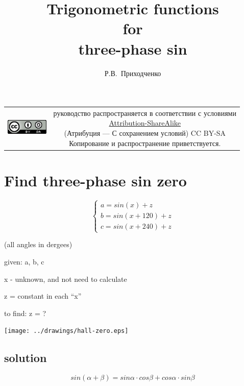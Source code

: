 \documentclass[unicode, 12pt, a4paper]{article}
\author{Р.В.~Приходченко}
\title{Trigonometric functions\\for\\three-phase sin}
\begin{document}
\maketitle



\begin{table}[ht]
  \begin{tabular}{cc}
    \includegraphics[width=2cm]{../CC_BY-SA_88x31.png} &
    \shortstack{руководство распространяется в соответствии с
      условиями\\
      \href{http://creativecommons.org/licenses/by-sa/3.0/}{Attribution-ShareAlike} \\
      (Атрибуция — С сохранением условий) CC BY-SA \\
      Копирование и распространение приветствуется.}
  \end{tabular}
\end{table}



\section{Find three-phase sin zero}

\begin{equation}
  \label{eq:zero-shift:three-phase-case}
  \begin{cases}
    a = sin(x)       + z\\
    b = sin(x + 120) + z\\
    c = sin(x + 240) + z
  \end{cases}
\end{equation}

(all angles in dergees)

given: a, b, c

x - unknown, and not need to calculate

z = constant in each ``x''

to find: z = ?

\texttt{[image: ../drawings/hall-zero.eps]}

\subsection{solution}

\begin{equation}
  \label{eq:trigonometric:rule:sin-a-b}
    sin (\alpha + \beta) = sin \alpha \cdot cos \beta + cos \alpha \cdot sin \beta
\end{equation}
\end{document}
